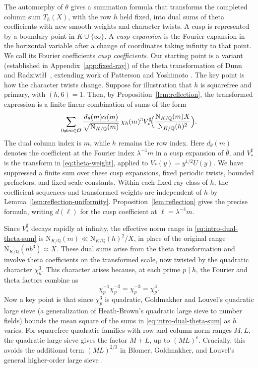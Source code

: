 \documentclass[11pt,a4paper]{article}
\numberwithin{equation}{section}
\numberwithin{figure}{section}
\theoremstyle{definition}
\theoremstyle{remark}
\newcommand{\Q}{\mathbb Q}
\newcommand{\NK}{\mathrm N_{K/\Q}}
\newcommand{\OO}{\mathcal O}
\begin{document}
The automorphy of $\theta$ gives a summation formula that transforms the completed column sum $T_h(X)$, with the row $h$ held fixed, into dual sums of theta coefficients with new smooth weights and character twists.
A cusp is represented by a boundary point in $K\cup\{\infty\}$. A \emph{cusp expansion} is the Fourier expansion in the horizontal variable after a change of coordinates taking infinity to that point. We call its Fourier coefficients \emph{cusp coefficients}.
Our starting point is a variant (established in Appendix~\ref{app:fixed-ray}) of the theta transformation of Dunn and Radziwi\l\l\ \cite[\S5]{DR}, extending work of Patterson \cite{Pat77} and Yoshimoto \cite{Yos87}. The key point is how the character twists change. Suppose for
illustration that $h$ is squarefree and primary, with $(h,6)=1$. Then, by Proposition~\ref{lem:reflection}, the transformed expression is a finite linear combination of sums of the form
\begin{equation}\label{eq:intro-dual-theta-sum}
 \sum_{0\ne m\in\OO}
 \frac{d_\theta(m)\alpha(m)}{\sqrt{\NK(m)}}\,
 \chi_h(m)^3
 V_*^\sharp\!\Bigl(\frac{\NK(m)X}{\NK(h)^2}\Bigr).
\end{equation}
The dual column index is $m$, while $h$ remains the row index.
Here $d_\theta(m)$ denotes the coefficient at the Fourier index
$\lambda^{-4}m$ in a cusp expansion of $\overline\theta$, and
$V_*^\sharp$ is the transform in \eqref{eq:theta-weight}, applied to $V_*(y)=y^{1/2}U(y)$.
We have suppressed
a finite sum over these cusp expansions, fixed periodic twists,
bounded prefactors, and fixed scale constants. Within each fixed
ray class of $h$, the coefficient sequences and transformed weights
are independent of $h$ by Lemma~\ref{lem:reflection-uniformity}.
Proposition~\ref{lem:reflection} gives the
precise formula, writing $d(\ell)$ for the cusp coefficient at
$\ell=\lambda^{-4}m$.

Since $V_*^\sharp$ decays rapidly at infinity, the effective norm range in \eqref{eq:intro-dual-theta-sum} is $\NK(m)\ll\NK(h)^2/X$, in place of the original range $\NK(nb^3)\asymp X$. These dual sums arise from the theta transformation and involve theta coefficients on the transformed scale, now twisted by the quadratic character $\chi_h^3$. This character arises because, at each prime $p\mid h$, the Fourier and theta factors combine as
\begin{equation}\label{eq:intro-quadratic-twist}
 \chi_p^{-1}\chi_p^{-2}=\chi_p^{-3}=\chi_p^3.
\end{equation}
Now a key point is that since $\chi_p^3$ is quadratic, Goldmakher and Louvel's quadratic large sieve \cite[Theorem~1.1 and Corollary~1.2]{GL} (a generalization of Heath-Brown's quadratic large sieve \cite{HB95} to number fields) bounds the mean square of the sums in \eqref{eq:intro-dual-theta-sum} as $h$ varies. For squarefree quadratic families with row and column norm ranges $M,L$, the quadratic large sieve gives the factor $M+L$, up to $(ML)^\varepsilon$. Crucially, this avoids the additional term $(ML)^{2/3}$ in Blomer, Goldmakher, and Louvel's general higher-order large sieve \cite[Theorem~1.3]{BGL}.
\end{document}
